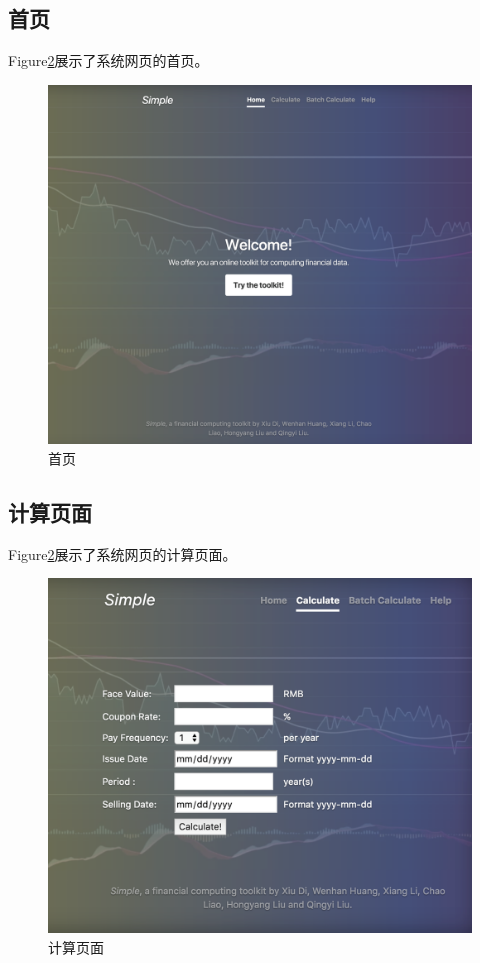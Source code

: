 \subsection{首页}
Figure\ref{fig:sys.param}展示了系统网页的首页。
\begin{figure}[H]
\begin{center}
\includegraphics[width=16cm]{img//homepage.PNG}
\caption{首页}
\label{fig:sys.param}
\end{center}
\end{figure}


\subsection{计算页面}
Figure\ref{fig:sys.param}展示了系统网页的计算页面。
\begin{figure}[H]
\begin{center}
\includegraphics[width=16cm]{img//calc_page.PNG}
\caption{计算页面}
\label{fig:sys.param}
\end{center}
\end{figure}


